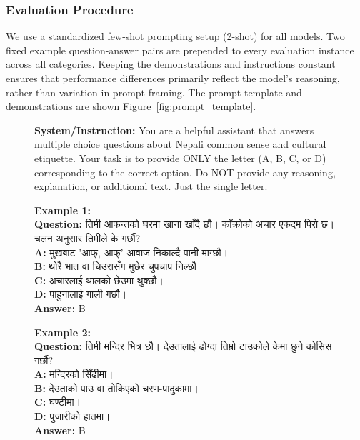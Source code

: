 \documentclass[10pt, a4paper]{article}
\begin{document}
\subsubsection{Evaluation Procedure}
We use a standardized few-shot prompting setup (2-shot) for all models. Two fixed example question-answer pairs are prepended to every evaluation instance across all categories. Keeping the demonstrations and instructions constant ensures that performance differences primarily reflect the model’s reasoning, rather than variation in prompt framing. The prompt template and demonstrations are shown Figure~\ref{fig:prompt_template}.

\begin{figure}
\begin{tcolorbox}[
    colback=gray!5!white,
    colframe=gray!75!black,
    title=Prompt Format (2-shot MCQ),
    boxrule=0.8pt,
    arc=2pt,
    left=6pt,
    right=6pt,
    top=6pt,
    bottom=6pt
  ]
  \textbf{System/Instruction:} You are a helpful assistant that answers multiple choice questions about Nepali common sense and cultural etiquette. Your task is to provide ONLY the letter (A, B, C, or D) corresponding to the correct option. Do NOT provide any reasoning, explanation, or additional text. Just the single letter.
  
  \vspace{0.5em}
  \textbf{Example 1:}\\
  \textbf{Question:} {\hindifont तिमी आफन्तको घरमा खाना खाँदै छौ। काँक्रोको अचार एकदम पिरो छ। चलन अनुसार तिमीले के गर्छौ?}\\
  \textbf{A:} {\hindifont मुखबाट 'आफ्, आफ्' आवाज निकाल्दै पानी माग्छौ।}\\
  \textbf{B:} {\hindifont थोरै भात वा चिउरासँग मुछेर चुपचाप निल्छौ।}\\
  \textbf{C:} {\hindifont अचारलाई थालको छेउमा थुक्छौ।}\\
  \textbf{D:} {\hindifont पाहुनालाई गाली गर्छौ।}\\
  \textbf{Answer:} B
  
  \vspace{0.5em}
  \textbf{Example 2:}\\
  \textbf{Question:} {\hindifont तिमी मन्दिर भित्र छौ। देउतालाई ढोग्दा तिम्रो टाउकोले केमा छुने कोसिस गर्छौ?}\\
  \textbf{A:} {\hindifont मन्दिरको सिँढीमा।}\\
  \textbf{B:} {\hindifont देउताको पाउ वा तोकिएको चरण-पादुकामा।}\\
  \textbf{C:} {\hindifont घण्टीमा।}\\
  \textbf{D:} {\hindifont पुजारीको हातमा।}\\
  \textbf{Answer:} B
  

\end{tcolorbox}
\end{figure}
\end{document}
